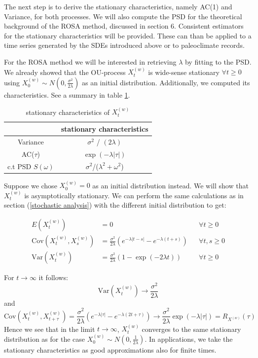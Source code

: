 \documentclass[%
thesis=student,%
coverpage=false,%
titlepage=false,%
headmarks=true, %
english,%
font=libertine, %
math=newpxtx, %
BCOR=5mm,%
coverBCOR=11mm%
]{tumbook}
\begin{document}
The next step is to derive the stationary characteristics, namely AC(1) and Variance, for both processes. We will also compute the PSD for the theoretical background of the ROSA method, discussed in section 6. Consistent estimators for the stationary characteristics will be provided. These can than be applied to a time series generated by the SDEs introduced above or to paleoclimate records. 

For the ROSA method we will be interested in retrieving $\lambda$ by fitting to the PSD. We already showed that the OU-process $X_{t}^{(w)}$ is wide-sense stationary $\forall t \geq 0$ using $X_{0}^{(w)} \sim N(0,\frac{\sigma^2}{2\lambda})$ as an initial distribution. Additionally, we computed its characteristics. See a summary in table \ref{tab:white_noise_stat_char}. 


\begin{table}[t]
\centering
\begin{tabular}{|c|c|}
\hline
& stationary characteristics\\
\hline
Variance & $\sigma^2$ / $(2\lambda)$\\
AC($\tau$) & $\exp(-\lambda |\tau|)$\\
c.t PSD $S(\omega)$ & $\sigma^2$/($\lambda^2 + \omega^2$)\\
\hline
\end{tabular}
\caption{stationary characteristics of $X_{t}^{(w)}$}
\label{tab:white_noise_stat_char}
\end{table}

Suppose we chose $X_{0}^{(w)} = 0$ as an initial distribution instead. We will show that $X_{t}^{(w)}$ is asymptotically stationary. We can perform the same calculations as in section (\ref{stochastic analysis}) with the different initial distribution to get:

 \begin{align*}
    E(X_{t}^{(w)}) &= 0   && \forall t \geq 0 \\
    \text{Cov}(X_{t}^{(w)},X_{s}^{(w)}) &= \frac{\sigma ^2}{2\lambda}(e^{-\lambda\lvert t-s \rvert}-e^{-\lambda(t+s)}) && \forall t, s \geq 0 \\
    \text{Var}(X_{t}^{(w)}) &= \frac{\sigma^2}{2\lambda}(1-\exp(-2\lambda t)) && \forall t \geq 0 
\end{align*}

For $t\rightarrow \infty$ it follows: 
\[
\text{Var}(X_{t}^{(w)})\rightarrow\frac{\sigma^2}{2\lambda}
\]
and 
\[
\text{Cov}(X_{t}^{(w)},X_{t+\tau}^{(w)}) = \frac{\sigma^2}{2\lambda}(e^{-\lambda\lvert \tau \rvert} - e^{-\lambda(2t + \tau)}) \rightarrow \frac{\sigma ^2}{2\lambda}\exp(-\lambda\lvert \tau \rvert) = R_{X^{(w)}}(\tau)
\]
Hence we see that in the limit $t\rightarrow \infty$, $X_{t}^{(w)}$ converges to the same stationary distribution as for the case $X_{0}^{(w)} \sim N(0,\frac{1}{2\lambda})$. 
In applications, we take the stationary characteristics as good approximations also for finite times.
\end{document}
